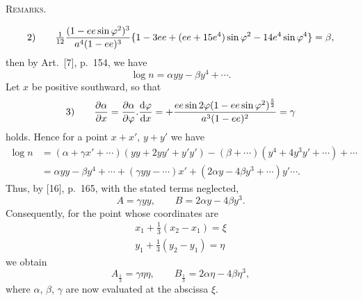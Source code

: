 \begingroup
\clearpage
{}\hfill\textsc{Remarks.}\hfill\mbox{}\par\medskip
\begingroup\footnotesize
\[
\begin{array}{r@{\qquad}l}
2)&\displaystyle \tfrac1{12}\frac{(1-ee\sin\varphi^2)^3}{a^4(1-ee)^3}
\{1-3ee+(ee+15e^4)\sin\varphi^2-14e^4\sin\varphi^4\}=\beta,
\end{array}
\]
then by Art.~[7], p.~154, we have
\[
\log n=\alpha yy-\beta y^4+\cdots.
\]
Let $x$ be positive southward, so that
\[
\begin{array}{r@{\qquad}l}
3)&\displaystyle\frac{\partial\alpha}{\partial x}
=\frac{\partial\alpha}{\partial\varphi}.\frac{\mathrm d\varphi}{\mathrm dx}
=+\frac{ee\sin2\varphi(1-ee\sin\varphi^2)^{\frac52}}{a^3(1-ee)^2}=\gamma
\end{array}
\]
holds. Hence for a point $x+x'$, $y+y'$ we have
\[
\begin{aligned}
\log n&=(\alpha+\gamma x'+\cdots)(yy+2yy'+y'y')-(\beta+\cdots)(y^4+4y^3y'+\cdots)+\cdots\\
&=\alpha yy-\beta y^4+\cdots+(\gamma yy-\cdots)x'+(2\alpha y-4\beta y^3+\cdots)y'\cdots.
\end{aligned}
\]
Thus, by [16], p.~165, with the stated terms neglected,
\[
A=\gamma yy,\qquad B=2\alpha y-4\beta y^3.
\]
Consequently, for the point whose coordinates are
\[
\begin{gathered}
x_1+\tfrac13(x_2-x_1)=\xi\\
y_1+\tfrac13(y_2-y_1)=\eta
\end{gathered}
\]
we obtain
\[
A_{\frac13}=\gamma\eta\eta,\qquad B_{\frac13}=2\alpha\eta-4\beta\eta^3,
\]
where $\alpha$, $\beta$, $\gamma$ are now evaluated at the abscissa $\xi$.

